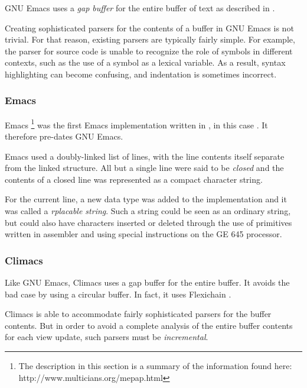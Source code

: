 GNU Emacs \cite{GNUEmacsLispReferenceManual}
\cite{CraftOfTextEditiing} uses a \emph{gap buffer} for the entire
buffer of text as described in .

Creating sophisticated parsers for the contents of a buffer in GNU
Emacs is not trivial.  For that reason, existing parsers are typically
fairly simple.  For example, the parser for \commonlisp{} source code
is unable to recognize the role of symbols in different contexts, such
as the use of a \commonlisp{} symbol as a lexical variable.  As a
result, syntax highlighting can become confusing, and indentation is
sometimes incorrect.

\subsubsection{\multics{} Emacs}

\multics{} Emacs%
\footnote{The description in this section is a summary of the
  information found here: http://www.multicians.org/mepap.html}
\cite{Greenberg:1980:MEC:800087.802784}
was the first Emacs implementation written in \lisp{}, in this case
\multics{} \maclisp{}.  It therefore pre-dates GNU Emacs.

\multics{} Emacs used a doubly-linked list of lines, with the line
contents itself separate from the linked structure.  All but a single
line were said to be \emph{closed} and the contents of a closed line
was represented as a compact character string.

For the current line, a new \maclisp{} data type was added to the
\multics{} \maclisp{} implementation and it was called a
\emph{rplacable string}.  Such a string could be seen as an ordinary
\maclisp{} string, but could also have characters inserted or deleted
through the use of primitives written in assembler and using special
instructions on the GE 645 processor.

\subsubsection{Climacs}

Like GNU Emacs, Climacs uses a gap buffer for the entire buffer.  It
avoids the bad case by using a circular buffer.  In fact, it uses
Flexichain \cite{flexichain}.

Climacs is able to accommodate fairly sophisticated parsers for the
buffer contents.  But in order to avoid a complete analysis of the
entire buffer contents for each view update, such parsers must be
\emph{incremental}.

